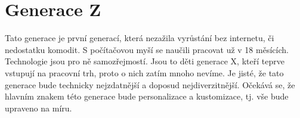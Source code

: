 \section{Generace Z}\label{sec:generace-z}
Tato generace je první generací, která nezažila vyrůstání bez internetu, či nedostatku komodit. S počítačovou myší se naučili pracovat už v 18 měsících.\cite{bergh2012coolznacky} Technologie jsou pro ně samozřejmostí.
Jsou to děti generace X, kteří teprve vstupují na pracovní trh, proto o nich zatím mnoho nevíme. Je jisté, že tato generace bude technicky nejzdatnější a doposud nejdiverzitnější. Očekává se, že hlavním znakem této generace bude personalizace a kustomizace, tj. vše bude upraveno na míru.

